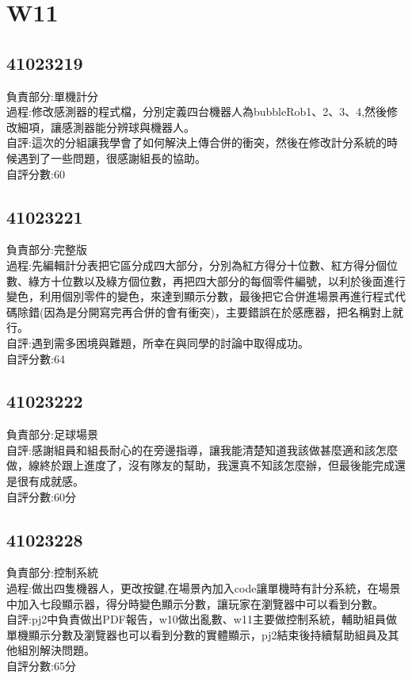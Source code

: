 \chapter{W11}


\section{41023219}

負責部分:單機計分\\過程:修改感測器的程式檔，分別定義四台機器人為bubbleRob1、2、3、4,然後修改細項，讓感測器能分辨球與機器人。\\自評:這次的分組讓我學會了如何解決上傳合併的衝突，然後在修改計分系統的時候遇到了一些問題，很感謝組長的協助。\\自評分數:60


\section{41023221}

負責部分:完整版\\過程:先編輯計分表把它區分成四大部分，分別為紅方得分十位數、紅方得分個位數、綠方十位數以及綠方個位數，再把四大部分的每個零件編號，以利於後面進行變色，利用個別零件的變色，來達到顯示分數，最後把它合併進場景再進行程式代碼除錯(因為是分開寫完再合併的會有衝突)，主要錯誤在於感應器，把名稱對上就行。\\自評:遇到需多困境與難題，所幸在與同學的討論中取得成功。\\自評分數:64

\section{41023222}

負責部分:足球場景\\自評:感謝組員和組長耐心的在旁邊指導，讓我能清楚知道我該做甚麼適和該怎麼做，線終於跟上進度了，沒有隊友的幫助，我還真不知該怎麼辦，但最後能完成還是很有成就感。\\自評分數:60分


\section{41023228}

負責部分:控制系統\\過程:做出四隻機器人，更改按鍵,在場景內加入code讓單機時有計分系統，在場景中加入七段顯示器，得分時變色顯示分數，讓玩家在瀏覽器中可以看到分數。\\自評:pj2中負責做出PDF報告，w10做出亂數、w11主要做控制系統，輔助組員做單機顯示分數及瀏覽器也可以看到分數的實體顯示，pj2結束後持續幫助組員及其他組別解決問題。\\自評分數:65分